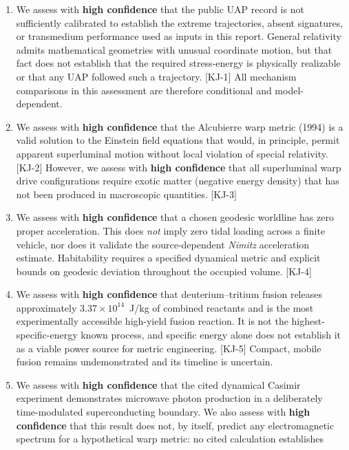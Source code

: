 \documentclass[aps,prd,twocolumn,superscriptaddress,nofootinbib,floatfix]{revtex4-2}
\begin{document}
\begin{enumerate}
  \item We assess with \textbf{high confidence} that the public UAP record is not
    sufficiently calibrated to establish the extreme trajectories, absent
    signatures, or transmedium performance used as inputs in this report. General
    relativity admits mathematical geometries with unusual coordinate motion, but
    that fact does not establish that the required stress-energy is physically
    realizable or that any UAP followed such a trajectory. [KJ-1] All mechanism
    comparisons in this assessment are therefore conditional and model-dependent.
  \item We assess with \textbf{high confidence} that the Alcubierre warp metric
    (1994) is a valid solution to the Einstein field equations that would, in
    principle, permit apparent superluminal motion without local violation of
    special relativity. [KJ-2] However, we assess with \textbf{high confidence}
    that all superluminal warp drive configurations require exotic matter
    (negative energy density) that has not been produced in macroscopic
    quantities. [KJ-3]
  \item\label{kj:tidal} We assess with \textbf{high confidence} that a chosen
    geodesic worldline has zero proper acceleration. This does \emph{not} imply
    zero tidal loading across a finite vehicle, nor does it validate the
    source-dependent \textit{Nimitz} acceleration estimate. Habitability requires a
    specified dynamical metric and explicit bounds on geodesic deviation
    throughout the occupied volume. [KJ-4]
  \item We assess with \textbf{high confidence} that deuterium--tritium fusion
    releases approximately $3.37\times10^{14}$~J/kg of combined reactants and is
    the most experimentally accessible high-yield fusion reaction. It is not the
    highest-specific-energy known process, and specific energy alone does not
    establish it as a viable power source for metric engineering. [KJ-5] Compact,
    mobile fusion remains undemonstrated and its timeline is uncertain.
  \item We assess with \textbf{high confidence} that the cited dynamical Casimir
    experiment demonstrates microwave photon production in a deliberately
    time-modulated superconducting boundary. We also assess with \textbf{high
    confidence} that this result does not, by itself, predict any electromagnetic
    spectrum for a hypothetical warp metric: no cited calculation establishes

\end{enumerate}
\end{document}

